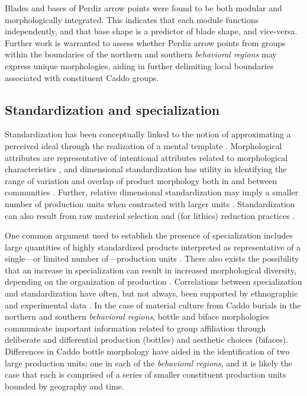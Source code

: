 \documentclass[smallextended]{svjour3}       %
\begin{document}
Blades and bases of Perdiz arrow points were found to be both modular
and morphologically integrated. This indicates that each module
functions independently, and that base shape is a predictor of blade
shape, and vice-versa. Further work is warranted to assess whether
Perdiz arrow points from groups within the boundaries of the northern
and southern \emph{behavioral regions} may express unique morphologies,
aiding in further delimiting local boundaries associated with
constituent Caddo groups.

\hypertarget{standardization-and-specialization}{%
\subsection{Standardization and
specialization}\label{standardization-and-specialization}}

Standardization has been conceptually linked to the notion of
approximating a perceived ideal through the realization of a mental
template \cite[156]{RN9715}. Morphological attributes are representative
of intentional attributes related to morphological characteristics
\cite{RN7051}, and dimensional standardization has utility in
identifying the range of variation and overlap of product morphology
both in and between communities \cite{RN5779}. Further, relative
dimensional standardization may imply a smaller number of production
units when contrasted with larger units \cite{RN7051}. Standardization
can also result from raw material selection and (for lithics) reduction
practices \cite{RN9712,RN9713,RN6494,RN9714}.

One common argument used to establish the presence of specialization
includes large quantities of highly standardized products interpreted as
representative of a single---or limited number of---production units
\cite{RN7019}. There also exists the possibility that an increase in
specialization can result in increased morphological diversity,
depending on the organization of production \cite{RN6451}. Correlations
between specialization and standardization have often, but not always,
been supported by ethnographic and experimental data
\cite{RN9725,RN9726,RN7137}. In the case of material culture from Caddo
burials in the northern and southern \emph{behavioral regions}, bottle
and biface morphologies communicate important information related to
group affiliation \cite{RN9727} through deliberate and differential
production (bottles) and aesthetic choices (bifaces). Differences in
Caddo bottle morphology have aided in the identification of two large
production units; one in each of the \emph{behavioral regions}, and it
is likely the case that each is comprised of a series of smaller
constituent production units bounded by geography and time.
\end{document}
